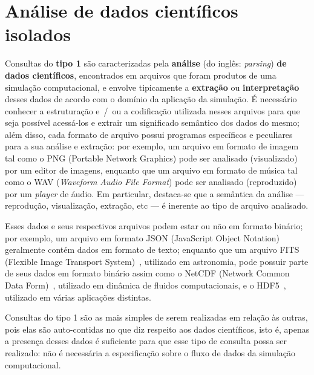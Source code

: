 \section{Análise de dados científicos isolados}%
\label{sec:analise-de-dados-cientificos-isolados}

Consultas do \textbf{tipo 1} são caracterizadas pela \textbf{análise} (do inglês: \textit{parsing}) \textbf{de dados científicos}, encontrados em arquivos que foram produtos de uma simulação computacional, e envolve tipicamente a \textbf{extração} ou \textbf{interpretação} desses dados de acordo com o domínio da aplicação da simulação. É necessário conhecer a estruturação e~/~ou a codificação utilizada nesses arquivos para que seja possível acessá-los e extrair um significado semântico dos dados do mesmo; além disso, cada formato de arquivo possui programas específicos e peculiares para a sua análise e extração: por exemplo, um arquivo em formato de imagem tal como o  PNG (Portable Network Graphics) pode ser analisado (visualizado) por um editor de imagens, enquanto que um arquivo em formato de música tal como o  WAV (\textit{Waveform Audio File Format}) pode ser analisado (reproduzido) por um \textit{player} de áudio. Em particular, destaca-se que a semântica da análise --- reprodução, visualização, extração, etc --- é inerente ao tipo de arquivo analisado.

Esses dados e seus respectivos arquivos podem estar ou não em formato binário; por exemplo, um arquivo em formato  JSON (JavaScript Object Notation) geralmente contém dados em formato de texto; enquanto que um arquivo FITS (Flexible Image Transport System)~\cite{greisen2002representations}, utilizado em astronomia, pode possuir parte de seus dados em formato binário assim como o NetCDF (Network Common Data Form)~\cite{rew1990netcdf}, utilizado em dinâmica de fluidos computacionais, e o HDF5~\cite{folk1999hdf5}, utilizado em várias aplicações distintas.

Consultas do tipo 1 são as mais simples de serem realizadas em relação às outras, pois elas são auto-contidas no que diz respeito aos dados científicos, isto é, apenas a presença desses dados é suficiente para que esse tipo de consulta possa ser realizado: não é necessária a especificação sobre o fluxo de dados da simulação computacional.


